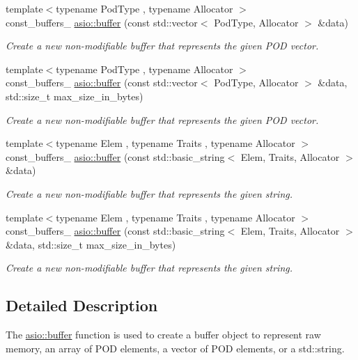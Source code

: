 \begin{DoxyCompactItemize}
{\footnotesize template$<$typename Pod\+Type , typename Allocator $>$ }\\const\+\_\+buffers\+\_ \hyperlink{group__buffer_gaa908d4c98b0745c8c51540e153627f44}{asio\+::buffer} (const std\+::vector$<$ Pod\+Type, Allocator $>$ \&data)
\begin{DoxyCompactList}\small\item\em Create a new non-\/modifiable buffer that represents the given P\+O\+D vector. \end{DoxyCompactList}\item 
{\footnotesize template$<$typename Pod\+Type , typename Allocator $>$ }\\const\+\_\+buffers\+\_ \hyperlink{group__buffer_gad172ef969f244d265d3cfcfea727b904}{asio\+::buffer} (const std\+::vector$<$ Pod\+Type, Allocator $>$ \&data, std\+::size\+\_\+t max\+\_\+size\+\_\+in\+\_\+bytes)
\begin{DoxyCompactList}\small\item\em Create a new non-\/modifiable buffer that represents the given P\+O\+D vector. \end{DoxyCompactList}\item 
{\footnotesize template$<$typename Elem , typename Traits , typename Allocator $>$ }\\const\+\_\+buffers\+\_ \hyperlink{group__buffer_gafe609d07578ac226c777107fbe51eff5}{asio\+::buffer} (const std\+::basic\+\_\+string$<$ Elem, Traits, Allocator $>$ \&data)
\begin{DoxyCompactList}\small\item\em Create a new non-\/modifiable buffer that represents the given string. \end{DoxyCompactList}\item 
{\footnotesize template$<$typename Elem , typename Traits , typename Allocator $>$ }\\const\+\_\+buffers\+\_ \hyperlink{group__buffer_gaa04e7aa3e90adacebceb59007629e923}{asio\+::buffer} (const std\+::basic\+\_\+string$<$ Elem, Traits, Allocator $>$ \&data, std\+::size\+\_\+t max\+\_\+size\+\_\+in\+\_\+bytes)
\begin{DoxyCompactList}\small\item\em Create a new non-\/modifiable buffer that represents the given string. \end{DoxyCompactList}\end{DoxyCompactItemize}


\subsection{Detailed Description}
The \hyperlink{group__buffer_ga1ed66e401559cbfd19595392f653b47c}{asio\+::buffer} function is used to create a buffer object to represent raw memory, an array of P\+O\+D elements, a vector of P\+O\+D elements, or a std\+::string. 

